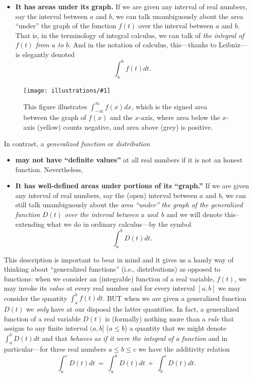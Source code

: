\documentclass[openany]{book}
\newcommand{\ill}[3]{%
   \begin{figure}[H]%
   \vspace{-2ex}
   \centering%
   \texttt{[image: illustrations/\#1]}%
   \caption{#3}%
   \vspace{-2ex}
    \end{figure}}
\theoremstyle{plain}
\theoremstyle{definition}
\begin{document}
{\begin{itemize}
\item {\bf It has areas under its graph.} If we are given any interval
  of real numbers, say the interval between $a$ and $b$, we can talk
  unambiguously about the area ``under'' the graph of the function
  $f(t)$ over the interval between $a$ and $b$.  That is, in the
  terminology of integral calculus, we can talk of {\it the integral of $f(t)$
    from $a$ to $b$}.  And in the notation of calculus, this---thanks
  to Leibniz---is elegantly denoted
$$\int_a^bf(t)dt.$$

\end{itemize}

   \ill{oo_integral}{.8}{This figure illustrates
      $\int_{-\infty}^{\infty} f(x) dx$, which is the signed area
      between the graph of $f(x)$ and the $x$-axis, where area below
      the $x$-axis (yellow) counts negative, and area above (grey) is
      positive.}


In contrast, a {\it generalized function}  or  {\it distribution}~\begin{itemize}
\item {\bf may not have ``definite values''} at all real numbers if it
  is not an honest function. Nevertheless,

\item {\bf It has well-defined areas under portions of its ``graph.''}
  If we are given any interval of real numbers, say the (open)
  interval between $a$ and $b$, we can still talk unambiguously about
  the {\it area ``under'' the graph of the generalized function $D(t)$
    over the interval between $a$ and~$b$} and we will denote
  this--extending what we do in ordinary calculus---by the symbol
$$\int_a^bD(t)dt.$$
\end{itemize}

This description is important to bear in mind and it gives us a handy
way of thinking about ``generalized functions'' (i.e., distributions)
as opposed to functions: when we consider an (integrable) function of
a real variable, $f(t)$, we may invoke its {\it value} at every real
number and for every interval $[a,b]$ we may consider the quantity
$\int_a^bf(t)dt$. BUT when we are given a generalized function $D(t)$
we {\it only} have at our disposal the latter quantities.  In fact, a
generalized function of a real variable $D(t)$ is (formally) nothing
more than a {\it rule} that assigns to any finite interval $(a,b]$ ($a
\le b$) a quantity that we might denote $\int_a^bD(t)dt$ and that {\it
  behaves as if it were the integral of a function} and in
particular---for three real numbers $a\le b\le c$ we have the
additivity relation
 $$  \int_a^cD(t)dt \ = \ \int_a^bD(t)dt \ + \ \int_b^cD(t)dt.$$

}
\end{document}
